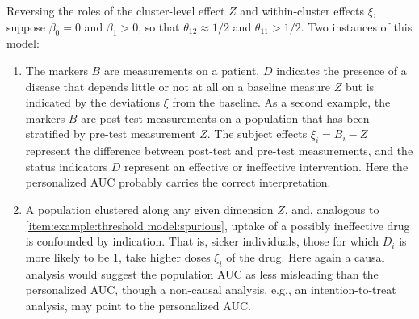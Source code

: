 \documentclass[12pt]{article}
\DeclareMathOperator{\AUC}{AUC}
\newcommand{\cind}{\perp \!\!\! \perp}
\newcommand{\aucindiv}{\theta_{11}}%
\newcommand{\aucpop}{\theta_{12}}%
\newcommand{\comment}[1]{
  \iftoggle{commenttoggle}{
    {\normalsize{\color{red}{ #1}}\normalsize}
  }
  {}
}
\begin{document}
Reversing the roles of the cluster-level effect $Z$ and within-cluster
effects $\xi$, suppose $\beta_0=0$ and $\beta_1>0$, so that $\aucpop\approx 1/2$ and
$\aucindiv>1/2$. Two instances of this model:
\begin{enumerate}[resume,label=(\alph*)]
\item  The markers $B$ are measurements on a patient,
$D$ indicates the presence of
a disease that depends little or not at all on a baseline measure $Z$ but is indicated by the deviations $\xi$ from the
baseline.  As a second example, the markers $B$ are post-test measurements on a population that has been stratified by pre-test measurement $Z$. The subject effects $\xi_i=B_i-Z$ represent the difference between post-test and pre-test measurements, and the status indicators $D$ represent an effective or ineffective intervention.
Here the personalized AUC probably carries the correct interpretation.
\item A population clustered along any given dimension $Z$, and, analogous to \ref{item:example:threshold model:spurious}, uptake of a possibly ineffective drug is confounded by indication. That is, sicker individuals, those for which $D_i$ is more likely to be $1$, take higher doses $\xi_i$ of the drug. Here again a causal analysis would suggest the population AUC as less misleading than the personalized AUC, though a non-causal analysis, e.g., an intention-to-treat analysis, may point to the personalized AUC.
\end{enumerate}



\end{document}
